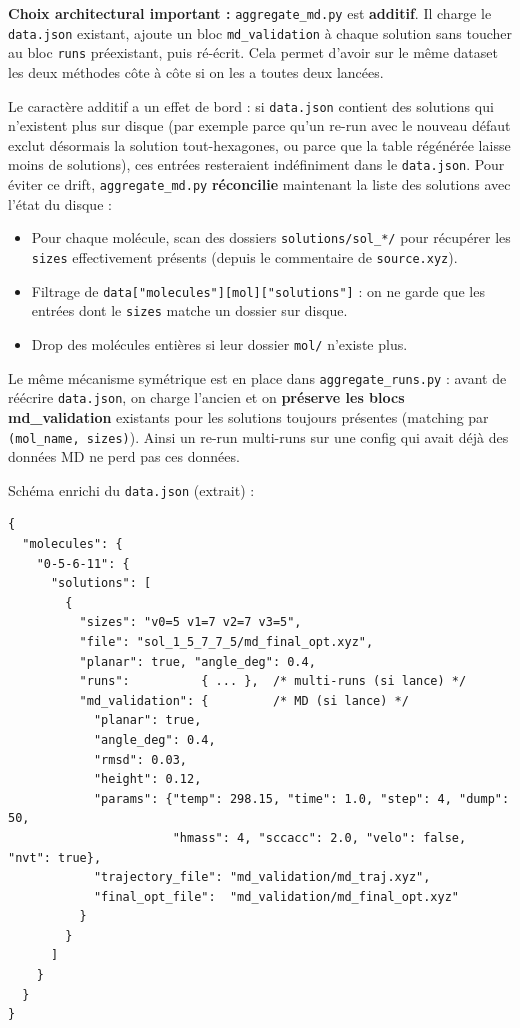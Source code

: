 \textbf{Choix architectural important :} \texttt{aggregate\_md.py} est \textbf{additif}. Il
charge le \texttt{data.json} existant, ajoute un bloc \texttt{md\_validation} à chaque
solution sans toucher au bloc \texttt{runs} préexistant, puis ré-écrit. Cela permet d'avoir
sur le même dataset les deux méthodes côte à côte si on les a toutes deux lancées.


Le caractère additif a un effet de bord : si \texttt{data.json} contient des solutions
qui n'existent plus sur disque (par exemple parce qu'un re-run avec le nouveau défaut
exclut désormais la solution tout-hexagones, ou parce que la table régénérée laisse
moins de solutions), ces entrées resteraient indéfiniment dans le \texttt{data.json}.
Pour éviter ce drift, \texttt{aggregate\_md.py} \textbf{réconcilie} maintenant la
liste des solutions avec l'état du disque :

\begin{itemize}
  \item Pour chaque molécule, scan des dossiers \texttt{solutions/sol\_*/} pour
    récupérer les \texttt{sizes} effectivement présents (depuis le commentaire de
    \texttt{source.xyz}).
  \item Filtrage de \texttt{data["molecules"][mol]["solutions"]} : on ne garde que les
    entrées dont le \texttt{sizes} matche un dossier sur disque.
  \item Drop des molécules entières si leur dossier \texttt{mol/} n'existe plus.
\end{itemize}

Le même mécanisme symétrique est en place dans \texttt{aggregate\_runs.py} : avant
de réécrire \texttt{data.json}, on charge l'ancien et on \textbf{préserve les blocs
md\_validation} existants pour les solutions toujours présentes (matching par
\texttt{(mol\_name, sizes)}). Ainsi un re-run multi-runs sur une config qui avait déjà
des données MD ne perd pas ces données.

Schéma enrichi du \texttt{data.json} (extrait) :

\begin{lstlisting}[style=benzai]
{
  "molecules": {
    "0-5-6-11": {
      "solutions": [
        {
          "sizes": "v0=5 v1=7 v2=7 v3=5",
          "file": "sol_1_5_7_7_5/md_final_opt.xyz",
          "planar": true, "angle_deg": 0.4,
          "runs":          { ... },  /* multi-runs (si lance) */
          "md_validation": {         /* MD (si lance) */
            "planar": true,
            "angle_deg": 0.4,
            "rmsd": 0.03,
            "height": 0.12,
            "params": {"temp": 298.15, "time": 1.0, "step": 4, "dump": 50,
                       "hmass": 4, "sccacc": 2.0, "velo": false, "nvt": true},
            "trajectory_file": "md_validation/md_traj.xyz",
            "final_opt_file":  "md_validation/md_final_opt.xyz"
          }
        }
      ]
    }
  }
}
\end{lstlisting}

